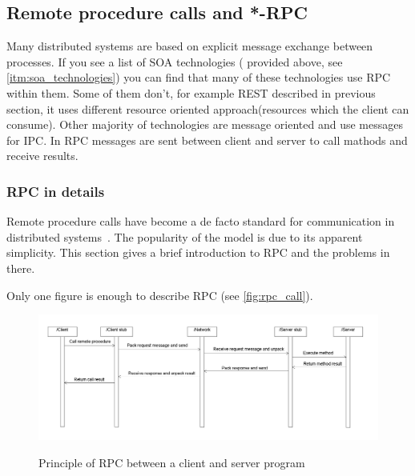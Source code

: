 \subsection{Remote procedure calls and *-RPC}
\label{sec:rpc}
Many distributed systems are based on explicit message exchange
between processes. If you see a list of SOA technologies ( provided above, see
\autoref{itm:soa_technologies}) you can find that many of these technologies use
RPC within them. Some of them don't, for example REST described in  previous
section, it uses different resource oriented approach(resources which
the client can consume). Other majority of technologies are message oriented and
use messages for \gls{IPC}. In RPC messages are sent between client and server
to call mathods and receive results. 

\subsubsection{RPC in details}
Remote procedure calls have become a de facto standard for communication
in distributed systems~\cite{tanenbaum07}. The popularity of the model is due to
its apparent simplicity.
This section gives a brief introduction to RPC and the problems in there.

Only one figure is enough to describe RPC (see \autoref{fig:rpc_call}).

% 



\begin{figure}
\centering
\scalebox{0.4}
{\includegraphics{../images/background/rpc_diagram.png}}
\caption{Principle of RPC between a client and server program}
\label{fig:rpc_call}
\end{figure}


